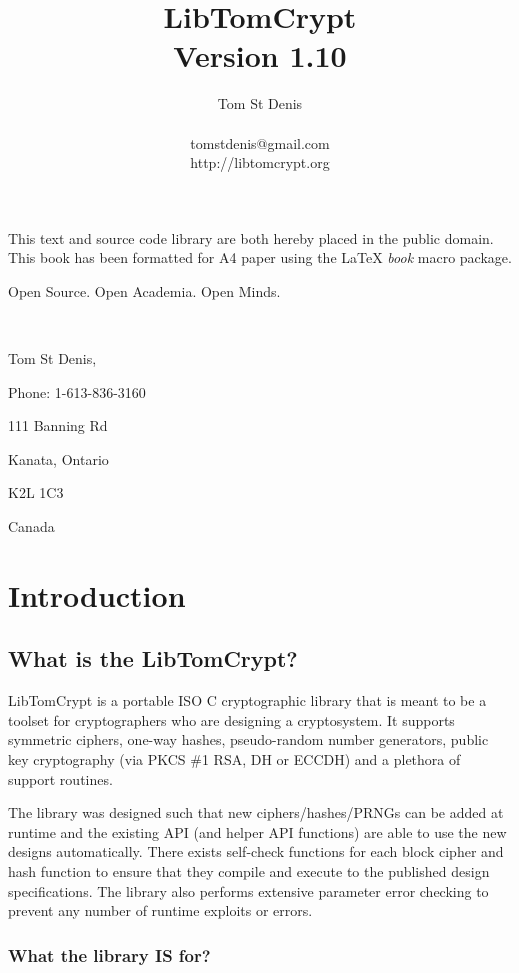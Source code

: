 \documentclass[a4paper]{book}
\begin{document}
\title{LibTomCrypt \\ Version 1.10}
\author{Tom St Denis \\
\\
tomstdenis@gmail.com \\
http://libtomcrypt.org
}
\maketitle
This text and source code library are both hereby placed in the public domain.  This book has been 
formatted for A4 paper using the \LaTeX{} {\em book} macro package.

\vspace{15cm}

\begin{flushright}Open Source.  Open Academia.  Open Minds.

\mbox{ }

Tom St Denis,

Phone: 1-613-836-3160

111 Banning Rd 

Kanata, Ontario 

K2L 1C3 

Canada
\end{flushright}
\newpage
\tableofcontents
\chapter{Introduction}
\section{What is the LibTomCrypt?}
LibTomCrypt is a portable ISO C cryptographic library that is meant to be a toolset for cryptographers who are 
designing a cryptosystem.  It supports symmetric ciphers, one-way hashes, pseudo-random number generators, 
public key cryptography (via PKCS \#1 RSA, DH or ECCDH) and a plethora of support 
routines.  

The library was designed such that new ciphers/hashes/PRNGs can be added at runtime and the existing API 
(and helper API functions) are able to use the new designs automatically.  There exists self-check functions for each 
block cipher and hash function to ensure that they compile and execute to the published design specifications.  The library 
also performs extensive parameter error checking to prevent any number of runtime exploits or errors.

\subsection{What the library IS for?}
\end{document}
